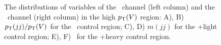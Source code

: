 \begin{figure}[htbp]
{    
  }
  \caption[High $\pT(\bosV)$ Control Region Distributions for the \ZllH\ Channels]{The distributions of variables of the \ZeeH\ channel (left column) and the \ZmmH\ channel (right column) in the high $\pT(\bosV)$ region: A), B) $p_{\mathrm{T}}(jj) / p_{\mathrm{T}}(V)$ for the \qrkt\qrktbar\ control region; C), D) $m(jj)$ for the \bosZ+light control region; E), F) \btagmin\ for the \bosZ+heavy control region.}
  \label{fig:CR_Zll_HighPt}
\end{figure}

\clearpage

 
 
 
